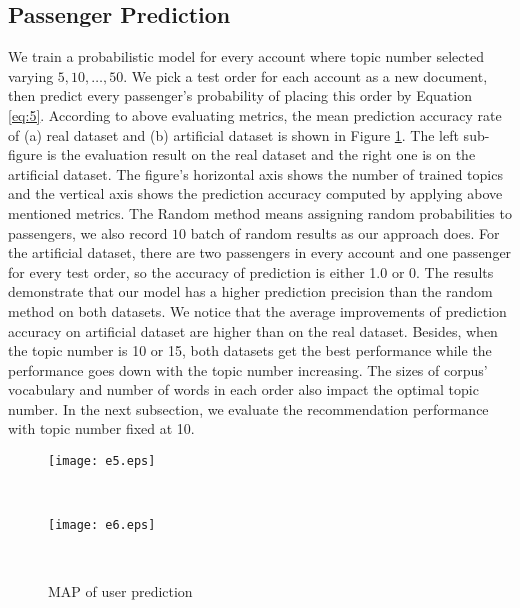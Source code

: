\documentclass{llncs}
\begin{document}
\subsection{Passenger Prediction}
We train a probabilistic model for every account where topic number selected varying ${5,10,\dots,50}$. We pick a test order for each account as a new document, then predict every passenger's probability of placing this order by Equation \ref{eq:5}. According to above evaluating metrics, the mean prediction accuracy rate of (a) real dataset and (b) artificial dataset is shown in Figure \ref{fig:pred}. The left sub-figure is the evaluation result on the real dataset and the right one is on the artificial dataset. The figure's horizontal axis shows the number of trained topics and the vertical axis shows the prediction accuracy computed by applying above mentioned metrics. The Random method means assigning random probabilities to passengers, we also record $10$ batch of random results as our approach does. For the artificial dataset, there are two passengers in every account and one passenger for every test order, so the accuracy of prediction is either 1.0 or 0. The results demonstrate that our model has a higher prediction precision than the random method on both datasets. We notice that the average improvements of prediction accuracy on artificial dataset are higher than on the real dataset. Besides, when the topic number is 10 or 15, both datasets get the best performance while the performance goes down with the topic number increasing. The sizes of corpus' vocabulary and number of words in each order also impact the optimal topic number. In the next subsection, we evaluate the recommendation performance with topic number fixed at 10.\par 

\begin{figure}[!h]
              \begin{minipage}[t]{0.47\linewidth}
              \centering
              \texttt{[image: e5.eps]}\\
              \end{minipage}
              \begin{minipage}[t]{0.005\linewidth}~~~
              \end{minipage}
              \begin{minipage}[t]{0.47\linewidth}
              \centering
              \texttt{[image: e6.eps]}\\
              \end{minipage}
              \begin{minipage}[t]{0.005\linewidth}~~~
              \end{minipage}
              \caption{MAP of user prediction}
          \label{fig:pred}
\end{figure}
\end{document}
